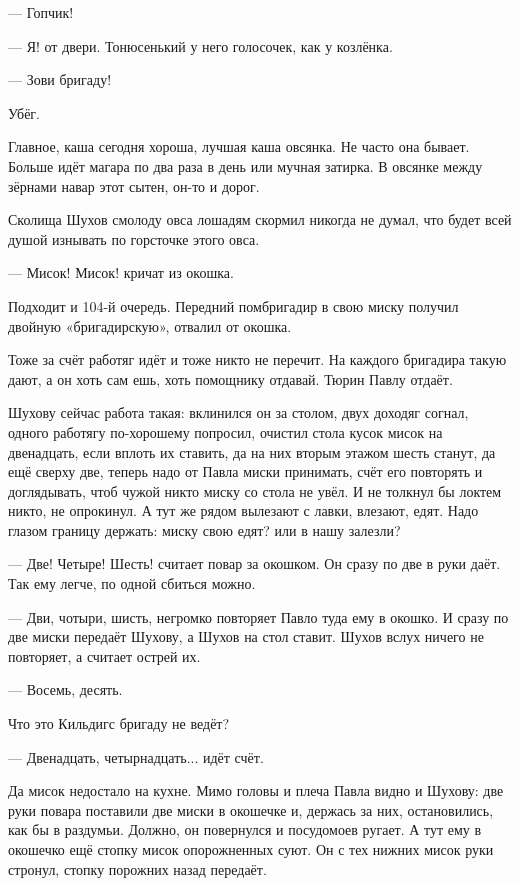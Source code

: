 --- Гопчик!

--- Я! \dash от двери. Тонюсенький у него голосочек, как у козлёнка.

--- Зови бригаду!

Убёг.

Главное, каша сегодня хороша, лучшая каша \dash овсянка. Не часто она бывает. Больше идёт магара
по два раза в день или мучная затирка. В овсянке между зёрнами \dash навар этот сытен, он-то и
дорог.

Сколища Шухов смолоду овса лошадям скормил \dash никогда не думал, что будет всей душой
изнывать по горсточке этого овса.

--- Мисок! Мисок! \dash кричат из окошка.

Подходит и 104-й очередь. Передний помбригадир в свою миску получил двойную «бригадирскую»,
отвалил от окошка.

Тоже за счёт работяг идёт \dash и тоже никто не перечит. На каждого бригадира такую дают, а он
хоть сам ешь, хоть помощнику отдавай. Тюрин Павлу отдаёт.

Шухову сейчас работа такая: вклинился он за столом, двух доходяг согнал, одного работягу
по-хорошему попросил, очистил стола кусок мисок на двенадцать, если вплоть их ставить, да на
них вторым этажом шесть станут, да ещё сверху две, теперь надо от Павла миски принимать, счёт
его повторять и доглядывать, чтоб чужой никто миску со стола не увёл. И не толкнул бы локтем
никто, не опрокинул. А тут же рядом вылезают с лавки, влезают, едят. Надо глазом границу
держать: миску \dash свою едят? или в нашу залезли?

--- Две! Четыре! Шесть! \dash считает повар за окошком. Он сразу по две в руки даёт. Так ему легче, по
одной сбиться можно.

--- Дви, чотыри, шисть, \dash негромко повторяет Павло туда ему в окошко. И сразу по две миски
передаёт Шухову, а Шухов на стол ставит. Шухов вслух ничего не повторяет, а считает острей их.

--- Восемь, десять.

Что это Кильдигс бригаду не ведёт?

--- Двенадцать, четырнадцать... \dash идёт счёт.

Да мисок недостало на кухне. Мимо головы и плеча Павла видно и Шухову: две руки повара
поставили две миски в окошечке и, держась за них, остановились, как бы в раздумьи. Должно, он
повернулся и посудомоев ругает. А тут ему в окошечко ещё стопку мисок опорожненных суют. Он с
тех нижних мисок руки стронул, стопку порожних назад передаёт.


